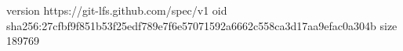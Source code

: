version https://git-lfs.github.com/spec/v1
oid sha256:27cfbf9f851b53f25edf789e7f6e57071592a6662c558ca3d17aa9efac0a304b
size 189769
